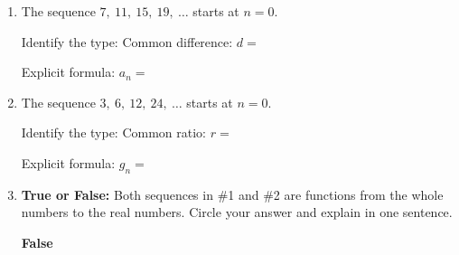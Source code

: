 \documentclass[10pt]{article}
\begin{document}
\namedateperiod

\vspace{0.16in}

\begin{enumerate}[itemsep=20pt]

\item The sequence $7,\ 11,\ 15,\ 19,\ \ldots$ starts at $n = 0$.

      Identify the type:  \quad Common difference: $d = $ 

      \vspace{0.06in}
      Explicit formula: $a_n = $ 

\item The sequence $3,\ 6,\ 12,\ 24,\ \ldots$ starts at $n = 0$.

      Identify the type:  \quad Common ratio: $r = $ 

      \vspace{0.06in}
      Explicit formula: $g_n = $ 

\item \textbf{True or False:} Both sequences in \#1 and \#2 are functions from the whole
      numbers to the real numbers. Circle your answer and explain in one sentence.

      \medskip
       \qquad\quad \textbf{False}

      \vspace{0.06in}

\end{enumerate}
\end{document}

